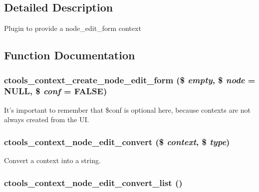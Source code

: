 \subsection{Detailed Description}
Plugin to provide a node\_\-edit\_\-form context 

\subsection{Function Documentation}
\hypertarget{node__edit__form_8inc_a29881827e4ad81240c15854d7ad36aba}{
\subsubsection[{ctools\_\-context\_\-create\_\-node\_\-edit\_\-form}]{\setlength{\rightskip}{0pt plus 5cm}ctools\_\-context\_\-create\_\-node\_\-edit\_\-form (\$ {\em empty}, \/  \$ {\em node} = {\ttfamily NULL}, \/  \$ {\em conf} = {\ttfamily FALSE})}}
\label{node__edit__form_8inc_a29881827e4ad81240c15854d7ad36aba}
It's important to remember that \$conf is optional here, because contexts are not always created from the UI. \hypertarget{node__edit__form_8inc_a23871551967cdac94aa4b64b71dfd7d8}{
\subsubsection[{ctools\_\-context\_\-node\_\-edit\_\-convert}]{\setlength{\rightskip}{0pt plus 5cm}ctools\_\-context\_\-node\_\-edit\_\-convert (\$ {\em context}, \/  \$ {\em type})}}
\label{node__edit__form_8inc_a23871551967cdac94aa4b64b71dfd7d8}
Convert a context into a string. \hypertarget{node__edit__form_8inc_a0dbe2d1dee992d9ba97df1be41bbaa11}{
\subsubsection[{ctools\_\-context\_\-node\_\-edit\_\-convert\_\-list}]{\setlength{\rightskip}{0pt plus 5cm}ctools\_\-context\_\-node\_\-edit\_\-convert\_\-list ()}}
